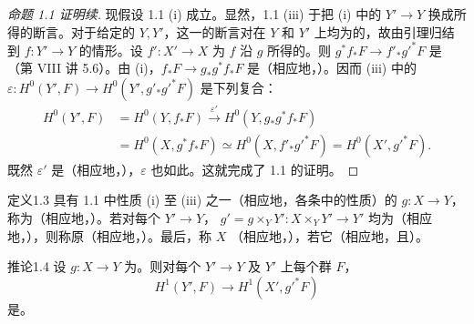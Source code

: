\begin{proof}[命题 1.1 证明续]
现假设 1.1 (i) 成立。显然，1.1 (iii) 于把 (i) 中的 $Y'\to Y$ 换成所得的断言。对于给定的 $Y,Y'$，这一的断言对在 $Y$ 和 $Y'$ 上均为的，故由引理归结到 $f:Y'\to Y$ 的情形。设 $f':X'\to X$ 为 $f$ 沿 $g$ 所得的。则 $g^*f_*F\to f'_*g'^*F$ 是（第 VIII 讲 5.6）。由 (i)，$f_*F\to g_*g^*f_*F$ 是（相应地，）。因而 (iii) 中的 $\varepsilon:H^0(Y',F)\to H^0(Y',g'_*g'^*F)$ 是下列复合：
\[
\begin{aligned}
H^0(Y',F)&=H^0(Y,f_*F)\xrightarrow{\varepsilon'}H^0(Y,g_*g^*f_*F)\\
&=H^0(X,g^*f_*F)\simeq H^0(X,f'_*g'^*F)=H^0(X',g'^*F).
\end{aligned}
\]
既然 $\varepsilon'$ 是（相应地，），$\varepsilon$ 也如此。这就完成了 1.1 的证明。
\end{proof}
\begin{SGAresult}{定义}{1.3}
具有 1.1 中性质 (i) 至 (iii) 之一（相应地，各条中的性质）的 $g:X\to Y$，称为（相应地，）。若对每个 $Y'\to Y$， $g'=g\times_Y Y':X\times_Y Y'\to Y'$ 均为（相应地，），则称原（相应地，）。最后，称 $X$ （相应地，），若它（相应地，且）。
\end{SGAresult}
\begin{SGAresult}{推论}{1.4}
设 $g:X\to Y$ 为。则对每个 $Y'\to Y$ 及 $Y'$ 上每个群 $F$，
\[H^1(Y',F)\longrightarrow H^1(X',g'^*F)\]
是。
\end{SGAresult}

